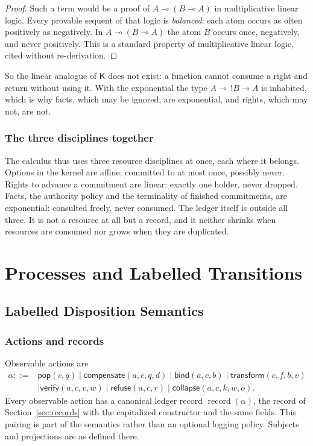 \documentclass[11pt,openany]{book}
\theoremstyle{remark}
\newcommand{\record}{\operatorname{record}}
\begin{document}
\begin{proof}
Such a term would be a proof of $A\multimap(B\multimap A)$ in
multiplicative linear logic. Every provable sequent of that logic is
\emph{balanced}: each atom occurs as often positively as negatively. In
$A\multimap(B\multimap A)$ the atom $B$ occurs once, negatively, and never
positively. This is a standard property of multiplicative linear logic,
cited without re-derivation.
\end{proof}

So the linear analogue of $\mathsf K$ does not exist: a function cannot
consume a right and return without using it. With the exponential the
type $A\multimap\,!B\multimap A$ is inhabited, which is why facts, which
may be ignored, are exponential, and rights, which may not, are not.

\section{The three disciplines together}

The calculus thus uses three resource disciplines at once, each where it
belongs. Options in the kernel are affine: committed to at most once,
possibly never. Rights to advance a commitment are linear: exactly one
holder, never dropped. Facts, the authority policy and the terminality
of finished commitments, are exponential: consulted freely, never
consumed. The ledger itself is outside all three. It is not a resource at
all but a record, and it neither shrinks when resources are consumed nor
grows when they are duplicated.

\part{Processes and Labelled Transitions}

\chapter{Labelled Disposition Semantics}
\label{ch:lts}

\section{Actions and records}

Observable actions are
\[
\begin{aligned}
\alpha ::= {}& \mathsf{pop}(c,q)
\mid \mathsf{compensate}(a,c,q,d)
\mid \mathsf{bind}(a,c,b)
\mid \mathsf{transform}(c,f,b,v)\\
&\mid \mathsf{verify}(a,c,v,w)
\mid \mathsf{refuse}(a,c,r)
\mid \mathsf{collapse}(a,c,k,w,o).
\end{aligned}
\]
Every observable action has a canonical ledger record $\record(\alpha)$,
the record of Section~\ref{sec:records} with the capitalized constructor
and the same fields. This pairing is part of the semantics rather than an
optional logging policy. Subjects and projections are as defined there.
\end{document}
